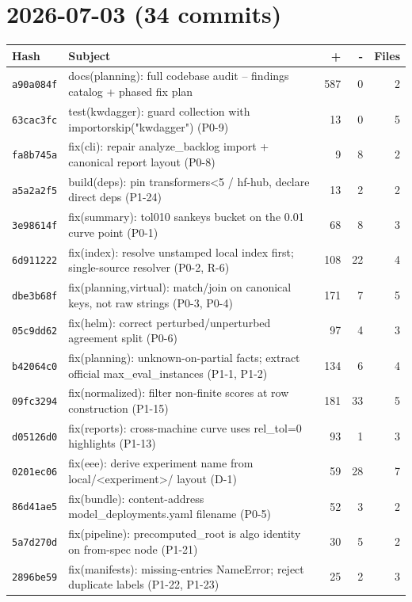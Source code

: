 \section*{2026-07-03 (34 commits)}
\begin{longtable}{@{}p{}p{}r r r@{}}
\toprule Hash & Subject & + & - & Files \\ \midrule\endhead
\texttt{a90a084f} & docs(planning): full codebase audit -- findings catalog + phased fix plan & 587 & 0 & 2 \\
\texttt{63cac3fc} & test(kwdagger): guard collection with importorskip("kwdagger") (P0-9) & 13 & 0 & 5 \\
\texttt{fa8b745a} & fix(cli): repair analyze\_backlog import + canonical report layout (P0-8) & 9 & 8 & 2 \\
\texttt{a5a2a2f5} & build(deps): pin transformers<5 / hf-hub, declare direct deps (P1-24) & 13 & 2 & 2 \\
\texttt{3e98614f} & fix(summary): tol010 sankeys bucket on the 0.01 curve point (P0-1) & 68 & 8 & 3 \\
\texttt{6d911222} & fix(index): resolve unstamped local index first; single-source resolver (P0-2, R-6) & 108 & 22 & 4 \\
\texttt{dbe3b68f} & fix(planning,virtual): match/join on canonical keys, not raw strings (P0-3, P0-4) & 171 & 7 & 5 \\
\texttt{05c9dd62} & fix(helm): correct perturbed/unperturbed agreement split (P0-6) & 97 & 4 & 3 \\
\texttt{b42064c0} & fix(planning): unknown-on-partial facts; extract official max\_eval\_instances (P1-1, P1-2) & 134 & 6 & 4 \\
\texttt{09fc3294} & fix(normalized): filter non-finite scores at row construction (P1-15) & 181 & 33 & 5 \\
\texttt{d05126d0} & fix(reports): cross-machine curve uses rel\_tol=0 highlights (P1-13) & 93 & 1 & 3 \\
\texttt{0201ec06} & fix(eee): derive experiment name from local/<experiment>/ layout (D-1) & 59 & 28 & 7 \\
\texttt{86d41ae5} & fix(bundle): content-address model\_deployments.yaml filename (P0-5) & 52 & 3 & 2 \\
\texttt{5a7d270d} & fix(pipeline): precomputed\_root is algo identity on from-spec node (P1-21) & 30 & 5 & 2 \\
\texttt{2896be59} & fix(manifests): missing-entries NameError; reject duplicate labels (P1-22, P1-23) & 25 & 2 & 3 \\

\end{longtable}

